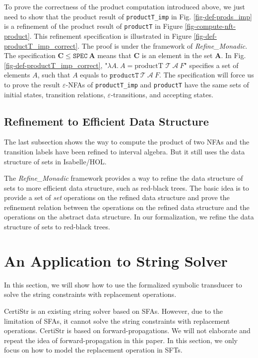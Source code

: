 \documentclass[a4paper,UKenglish,cleveref, autoref, thm-restate]{lipics-v2021}
\begin{document}
  To prove the correctness of the product computation introduced above, we just need to show that the product result of \texttt{productT\_imp} in Fig. \ref{fig-def-prods_imp} is a refinement of the product result of \texttt{productT} in Figure \ref{fig-compute-nft-product}. This refinement specification is illustrated in Figure \ref{fig-def-productT_imp_correct}. The proof is under the framework of \emph{Refine\_Monadic}. The specification $\mathbf{C} \leq\texttt{SPEC}~\mathbf{A}$ means that $\mathbf{C}$ is an element in the set $\mathbf{A}$. In Fig. \ref{fig-def-productT_imp_correct}, "$\lambda A.~A = \text{productT } \mathcal{T}~\mathcal{A}~F$" specifies a set of elements $A$, such that $A$ equals to $\texttt{productT}~\mathcal{T}~\mathcal{A}~F$. 
  The specification will force us to prove the result $\varepsilon$-NFAs of \texttt{productT\_imp}  and \texttt{productT} have the same sets of initial states, transition relations, $\varepsilon$-transitions, and accepting states.

\subsection{Refinement to Efficient Data Structure}

The last subsection shows the way to compute the product of two NFAs and the transition labels have been refined to interval algebra. But it still uses the data structure of sets in Isabelle/HOL. 

The \emph{Refine\_Monadic} framework provides a way to refine the data structure of sets to more efficient data structure, such as red-black trees. The basic idea is to provide a set of \emph{set} operations on the refined data structure and prove the refinement relation between the operations on the refined data structure and the operations on the abstract data structure.
%
In our formalization, we refine the data structure of sets to red-black trees.








\section{An Application to String Solver}
\label{sec-app-str-solver}
In this section, we will show how to use the formalized symbolic transducer to solve the string constraints with replacement operations.

CertiStr is an existing string solver based on SFAs. However, due to the limitation of SFAs, it cannot solve the string constraints with replacement operations. CertiStr is based on forward-propagations. We will not elaborate and repeat the idea of forward-propagation in this paper. In this section, we only focus on how to model the replacement operation in SFTs.
\end{document}
